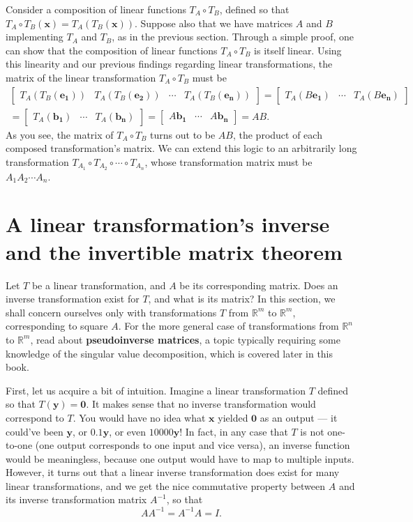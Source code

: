 \documentclass[draft,12pt]{report}
\renewcommand{\vec}[1]{\mathbf{#1}}
\begin{document}
Consider a composition of linear functions $T_A \circ T_B$, defined so that $T_A \circ T_B(\textbf{x}) = T_A(T_B(\textbf{x}))$. Suppose also that we have matrices $A$ and $B$ implementing $T_A$ and $T_B$, as in the previous section. Through a simple proof, one can show that the composition of linear functions $T_A \circ T_B$ is itself linear. Using this linearity and our previous findings regarding linear transformations, the matrix of the linear transformation $T_A \circ T_B$ must be
\begin{multline*}
    \begin{bmatrix}
        T_A(T_B(\vec{e_1})) & T_A(T_B(\vec{e_2})) & \cdots & T_A(T_B(\vec{e_n}))
    \end{bmatrix} = \begin{bmatrix}
        T_A(B\vec{e_1}) & \cdots & T_A(B\vec{e_n})
    \end{bmatrix} \\
    = \begin{bmatrix}
        T_A(\vec{b_1}) & \cdots & T_A(\vec{b_n})
    \end{bmatrix} = \begin{bmatrix}
        A\vec{b_1} & \cdots & A\vec{b_n}
    \end{bmatrix} = AB.
\end{multline*}
As you see, the matrix of $T_A \circ T_B$ turns out to be $AB$, the product of each composed transformation's matrix. We can extend this logic to an arbitrarily long transformation $T_{A_1} \circ T_{A_2} \circ \cdots \circ T_{A_n}$, whose transformation matrix must be $A_1 A_2 \cdots A_n$.

\section{A linear transformation's inverse and the invertible matrix theorem}

Let $T$ be a linear transformation, and $A$ be its corresponding matrix. Does an inverse transformation exist for $T$, and what is its matrix? In this section, we shall concern ourselves only with transformations $T$ from $\mathbb R^m$ to $\mathbb R^m$, corresponding to square $A$. For the more general case of transformations from $\mathbb R^n$ to $\mathbb R^m$, read about \textbf{pseudoinverse matrices}, a topic typically requiring some knowledge of the singular value decomposition, which is covered later in this book.

First, let us acquire a bit of intuition. Imagine a linear transformation $T$ defined so that $T(\vec{y}) = \vec{0}$. It makes sense that no inverse transformation would correspond to $T$. You would have no idea what $\vec{x}$ yielded $\vec{0}$ as an output --- it could've been $\vec{y}$, or $0.1\vec{y}$, or even $10000\vec{y}$! In fact, in any case that $T$ is not one-to-one (one output corresponds to one input and vice versa), an inverse function would be meaningless, because one output would have to map to multiple inputs. However, it turns out that a linear inverse transformation does exist for many linear transformations, and we get the nice commutative property between $A$ and its inverse transformation matrix $A^{-1}$, so that
\[ AA^{-1} = A^{-1}A = I. \]
\end{document}
